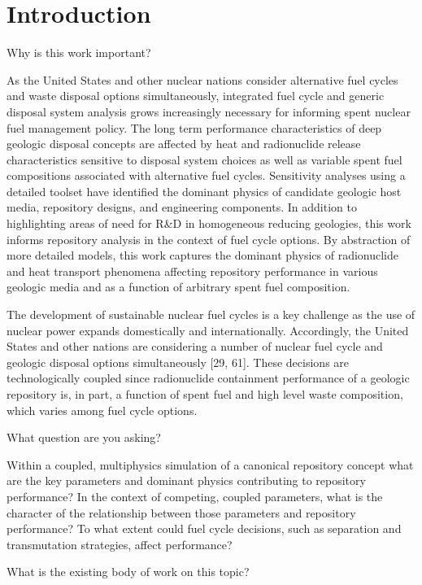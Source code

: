 
\section{Introduction}



Why is this work important? 

As the United States and other nuclear nations consider alternative fuel cycles and waste disposal options simultaneously, integrated fuel cycle and generic disposal system analysis grows increasingly necessary for informing spent nuclear fuel management policy. 
The long term performance characteristics of deep geologic disposal concepts are affected by heat and radionuclide release characteristics sensitive to disposal system choices as well as variable spent fuel compositions associated with alternative fuel cycles.
Sensitivity analyses using a detailed toolset have identified the dominant physics of candidate geologic host media, repository designs, and engineering components. 
In addition to highlighting areas of need for R&D in homogeneous reducing geologies, this work informs repository analysis in the context of fuel cycle options.
By abstraction of more detailed models, this work captures the dominant physics of radionuclide and heat transport phenomena affecting repository performance in various geologic media and as a function of arbitrary spent fuel composition.

The development of sustainable nuclear fuel cycles is a key challenge as the use of nuclear power expands domestically and internationally. Accordingly, the United States and other nations are considering a number of nuclear fuel cycle and geologic disposal options simultaneously [29, 61]. These decisions are technologically coupled since radionuclide containment performance of a geologic repository is, in part, a function of spent fuel and high level waste composition, which varies among fuel cycle options.

What question are you asking? 

Within a coupled, multiphysics simulation of a canonical repository concept what are the key parameters and dominant physics contributing to repository performance?
In the context of competing, coupled parameters, what is the character of the relationship between those parameters and repository performance?
To what extent could fuel cycle decisions, such as separation and transmutation strategies, affect performance?


What is the existing body of work on this topic?


